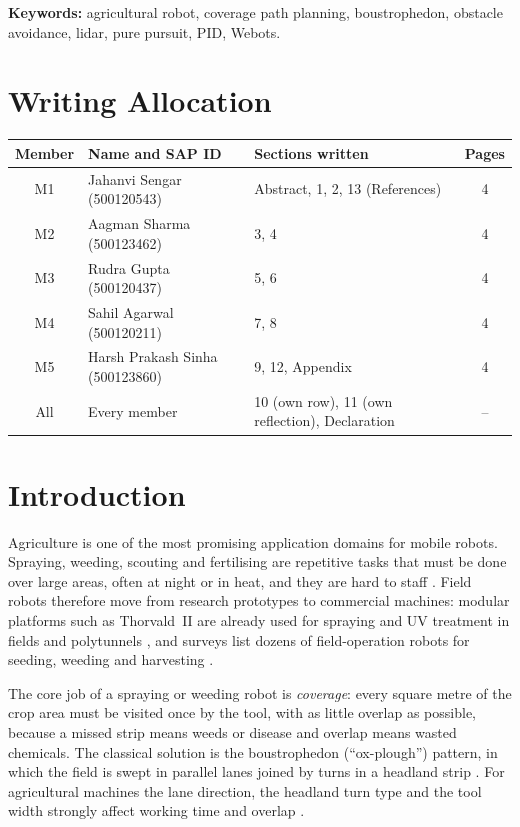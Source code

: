 \documentclass[12pt,a4paper]{article}
\begin{document}
\textbf{Keywords:} agricultural robot, coverage path planning, boustrophedon, obstacle avoidance, lidar, pure pursuit, PID, Webots.
\newpage

\tableofcontents
\newpage
\listoffigures
{}
\listoftables
{}
\newpage

\section*{Writing Allocation}
\renewcommand{\arraystretch}{1.6}
\begin{tabular}{|c|P{4.6cm}|P{5.4cm}|c|}
\hline
\textbf{Member} & \textbf{Name and SAP ID} & \textbf{Sections written} & \textbf{Pages} \\ \hline
M1 & Jahanvi Sengar (500120543) & Abstract, 1, 2, 13 (References) & 4 \\ \hline
M2 & Aagman Sharma (500123462) & 3, 4 & 4 \\ \hline
M3 & Rudra Gupta (500120437) & 5, 6 & 4 \\ \hline
M4 & Sahil Agarwal (500120211) & 7, 8 & 4 \\ \hline
M5 & Harsh Prakash Sinha (500123860) & 9, 12, Appendix & 4 \\ \hline
All & Every member & 10 (own row), 11 (own reflection), Declaration & -- \\ \hline
\end{tabular}
\renewcommand{\arraystretch}{1.2}
\newpage

\setcounter{page}{1}
\section{Introduction}
Agriculture is one of the most promising application domains for mobile robots. Spraying, weeding, scouting and fertilising are repetitive tasks that must be done over large areas, often at night or in heat, and they are hard to staff \cite{vougioukas2019}. Field robots therefore move from research prototypes to commercial machines: modular platforms such as Thorvald~II are already used for spraying and UV treatment in fields and polytunnels \cite{grimstad2017}, and surveys list dozens of field-operation robots for seeding, weeding and harvesting \cite{bechar2016}.

The core job of a spraying or weeding robot is \emph{coverage}: every square metre of the crop area must be visited once by the tool, with as little overlap as possible, because a missed strip means weeds or disease and overlap means wasted chemicals. The classical solution is the boustrophedon (``ox-plough'') pattern, in which the field is swept in parallel lanes joined by turns in a headland strip \cite{choset2000,galceran2013}. For agricultural machines the lane direction, the headland turn type and the tool width strongly affect working time and overlap \cite{oksanen2009}.
\end{document}
